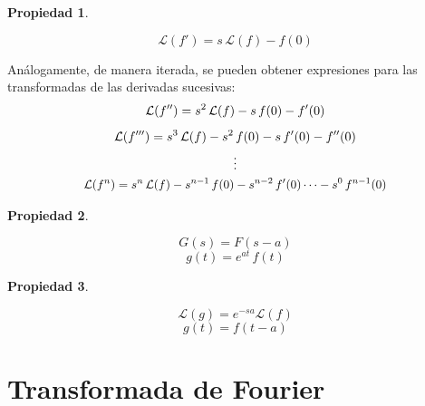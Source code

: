 \documentclass[a5paper,12pt,twoside]{book}
\newtheorem{prop}{{Propiedad}}[chapter]
\begin{document}
\begin{mdframed}[style=MyFrame1]
    \begin{prop}
    \end{prop}
    \begin{equation*}
        \mathcal{L}(f') = s \, \mathcal{L}(f) - f(0)
    \end{equation*}
\end{mdframed}

Análogamente, de manera iterada, se pueden obtener expresiones para las transformadas de las derivadas sucesivas:
\begin{gather*}
    \mathcal{L}(f'') = s^2 \, \mathcal{L}(f) - s \, f(0) - f'(0)
    \\[1ex]
    \mathcal{L}(f''') = s^3 \, \mathcal{L}(f) - s^2 \, f(0) - s \, f'(0) - f''(0)
    \\
    \vdots
    \\
    \scale{0.95}{
    \mathcal{L}(f^n) = s^\nth \,\mathcal{L}(f) - s^{\nth-1} \, f(0) - s^{\nth-2} \, f'(0) \dots - s^0 \, f^{\nth-1}(0)
    }
\end{gather*}

\begin{mdframed}[style=MyFrame1]
    \begin{prop}
    \end{prop}
    \begin{equation*}
        G(s) = F(s-a)
    \end{equation*}
    \begin{equation*}
        g(t) = e^{at} \, f(t)
    \end{equation*}
\end{mdframed}

\begin{mdframed}[style=MyFrame1]
    \begin{prop}
    \end{prop}
    \begin{equation*}
        \mathcal{L}(g)=e^{-sa}\mathcal{L}(f)
    \end{equation*}
    \begin{equation*}
        g(t) = f(t-a)
    \end{equation*}
\end{mdframed}


\section{Transformada de Fourier}
\end{document}

